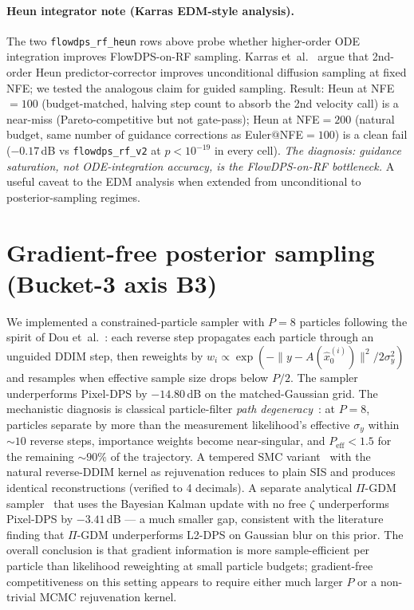 \documentclass{article}
\begin{document}
\paragraph{Heun integrator note (Karras EDM-style analysis).}
The two \texttt{flowdps\_rf\_heun} rows above probe whether
higher-order ODE integration improves FlowDPS-on-RF sampling.
Karras et~al.~\citep{karras2022edm} argue that 2nd-order Heun
predictor-corrector improves unconditional diffusion sampling at fixed
NFE; we tested the analogous claim for guided sampling. Result: Heun
at NFE${=}100$ (budget-matched, halving step count to absorb the 2nd
velocity call) is a near-miss (Pareto-competitive but not gate-pass);
Heun at NFE${=}200$ (natural budget, same number of guidance
corrections as Euler${@}$NFE${=}100$) is a clean fail ($-0.17$\,dB vs
\texttt{flowdps\_rf\_v2} at $p<10^{-19}$ in every cell). \emph{The
diagnosis: guidance saturation, not ODE-integration accuracy, is the
FlowDPS-on-RF bottleneck.} A useful caveat to the EDM analysis when
extended from unconditional to posterior-sampling regimes.

\section{Gradient-free posterior sampling (Bucket-3 axis B3)}
\label{app:gradfree}

We implemented a constrained-particle sampler with $P=8$ particles
following the spirit of Dou et~al.~\citep{dou2026particle}: each
reverse step propagates each particle through an unguided DDIM step,
then reweights by
$w_i \propto \exp(-\|y - A(\hat x_0^{(i)})\|^2 / 2\sigma_y^2)$
and resamples when effective sample size drops below $P/2$. The
sampler underperforms Pixel-DPS by $-14.80$\,dB on the matched-Gaussian
grid. The mechanistic diagnosis is classical particle-filter \emph{path
degeneracy}~\citep{doucet2001smc}: at $P=8$, particles separate by
more than the measurement likelihood's effective $\sigma_y$ within
$\sim 10$ reverse steps, importance weights become near-singular, and
$P_{\text{eff}} < 1.5$ for the remaining $\sim 90\%$ of the trajectory.
A tempered SMC variant~\citep{delmoral2006smc} with the natural
reverse-DDIM kernel as rejuvenation reduces to plain SIS and produces
identical reconstructions (verified to 4 decimals). A separate
analytical $\Pi$-GDM sampler~\citep{song2023pigdm} that uses the
Bayesian Kalman update with no free $\zeta$ underperforms Pixel-DPS by
$-3.41$\,dB --- a much smaller gap, consistent with the literature
finding that $\Pi$-GDM underperforms L2-DPS on Gaussian blur on this
prior. The overall conclusion is that gradient information is more
sample-efficient per particle than likelihood reweighting at small
particle budgets; gradient-free competitiveness on this setting
appears to require either much larger $P$ or a non-trivial MCMC
rejuvenation kernel.
\end{document}
